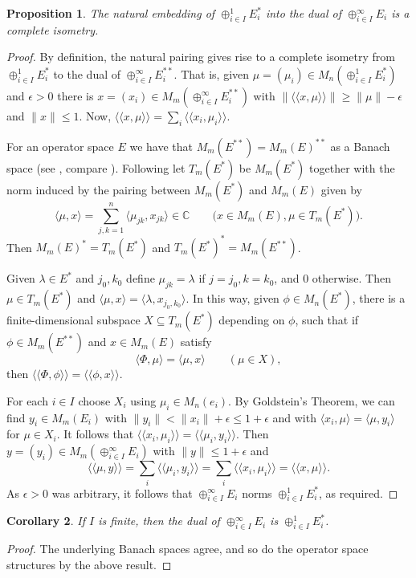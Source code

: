 \documentclass[a4paper,11pt]{article}
\theoremstyle{plain}
\newtheorem{proposition}{Proposition}[section]
\newtheorem{corollary}[proposition]{Corollary}
\theoremstyle{definition}
\newcommand{\ip}[2]{\langle{#1},{#2}\rangle}
\newcommand{\osip}[2]{\langle\langle{#1},{#2}\rangle\rangle}
\begin{document}
\begin{proposition}
The natural embedding of $\oplus_{i\in I}^1 E_i^*$ into the dual of $\oplus_{i\in I}^\infty
E_i$ is a complete isometry.
\end{proposition}
\begin{proof}
By definition, the natural pairing gives rise to a complete isometry from
$\oplus_{i\in I}^1 E_i^*$ to the dual of $\oplus_{i\in I}^\infty E_i^{**}$.  That is,
given $\mu=(\mu_i)\in M_n(\oplus_{i\in I}^1 E_i^*)$ and $\epsilon>0$ there is
$x=(x_i)\in M_m(\oplus_{i\in I}^\infty E_i^{**})$ with $\|\osip{x}{\mu}\|\geq
\|\mu\|-\epsilon$ and $\|x\|\leq 1$.
Now, $\osip{x}{\mu} = \sum_i \osip{x_i}{\mu_i}$.

For an operator space $E$ we have that $M_m(E^{**}) = M_m(E)^{**}$ as a Banach space (see
\cite[Proposition~7.1.6]{er}, compare \cite[Lemma~4.1.1]{er}).  Following \cite[Section~4.1]{er}
let $T_m(E^*)$ be $M_m(E^*)$ together with the norm induced by the pairing between $M_m(E^*)$
and $M_m(E)$ given by
\[ \ip{\mu}{x} = \sum_{j,k=1}^n \ip{\mu_{jk}}{x_{jk}} \in\mathbb C
\qquad \big( x\in M_m(E), \mu\in T_m(E^*) \big). \]
Then $M_m(E)^* = T_m(E^*)$ and $T_m(E^*)^* = M_m(E^{**})$.

Given $\lambda\in E^*$ and $j_0,k_0$ define $\mu_{jk} = \lambda$ if $j=j_0, k=k_0$,
and $0$ otherwise.  Then $\mu\in T_m(E^*)$ and $\ip{\mu}{x} = \ip{\lambda}{x_{j_0, k_0}}$.
In this way, given $\phi\in M_n(E^*)$, there is a finite-dimensional subspace
$X\subseteq T_m(E^*)$ depending on $\phi$, such that if $\phi\in M_m(E^{**})$ and
$x\in M_m(E)$ satisfy
\[ \ip{\Phi}{\mu} = \ip{\mu}{x} \qquad (\mu\in X), \]
then $\osip{\Phi}{\phi} = \osip{\phi}{x}$.

For each $i\in I$ choose $X_i$ using $\mu_i\in M_n(e_i)$.
By Goldstein's Theorem, we can find $y_i \in M_m(E_i)$ with $\|y_i\| < \|x_i\|+\epsilon
\leq 1+\epsilon$ and with $\ip{x_i}{\mu} = \ip{\mu}{y_i}$ for $\mu\in X_i$.
It follows that $\osip{x_i}{\mu_i} = \osip{\mu_i}{y_i}$.  Then $y=(y_i) \in
M_m(\oplus_{i\in I}^\infty E_i)$ with $\|y\|\leq 1+\epsilon$ and
\[ \osip{\mu}{y} = \sum_i \osip{\mu_i}{y_i} = \sum_i \osip{x_i}{\mu_i}
= \osip{x}{\mu}. \]
As $\epsilon>0$ was arbitrary, it follows that $\oplus_{i\in I}^\infty E_i$ norms
$\oplus_{i\in I}^1 E_i^*$, as required.
\end{proof}

\begin{corollary}
If $I$ is finite, then the dual of $\oplus_{i\in I}^\infty E_i$ is $\oplus_{i\in I}^1
E_i^*$.
\end{corollary}
\begin{proof}
The underlying Banach spaces agree, and so do the operator space structures by the
above result.
\end{proof}
\end{document}
